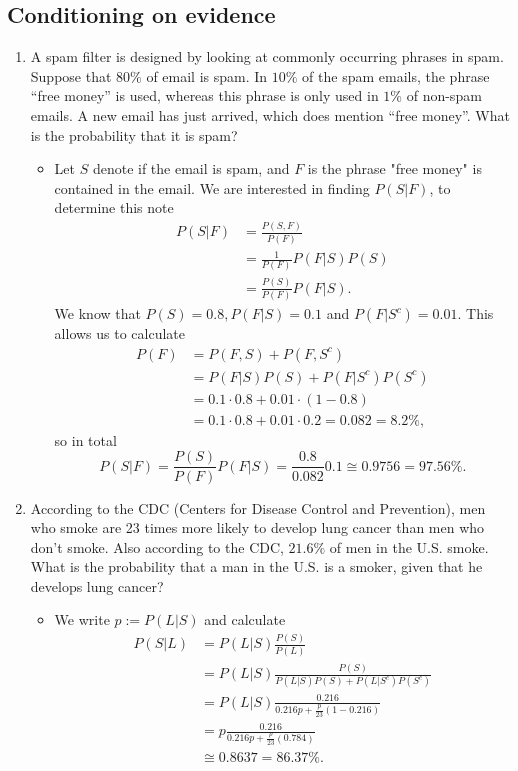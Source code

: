 \documentclass{article}
\begin{document}
\subsection{Conditioning on evidence}
\begin{enumerate}
	\item A spam filter is designed by looking at commonly occurring phrases in spam. Suppose that $80\%$ of email is spam. In $10\%$ of the spam emails, the phrase “free money” is used, whereas this phrase is only used in $1\%$ of non-spam emails. A new email has just arrived, which does mention “free money”. What is the probability that it is spam?
		\begin{itemize}
			\item Let $S$ denote if the email is spam, and $F$ is the phrase "free money" is contained in the email. We are interested in finding $P(S|F)$, to determine this note
			$$
			\begin{aligned}
			P(S|F) &= \frac{P(S, F)}{P(F)} \\
			&= \frac{1}{P(F)} P(F|S)P(S) \\
			&= \frac{P(S)}{P(F)} P(F|S).
			\end{aligned}
			$$
			We know that $P(S) = 0.8, P(F|S) = 0.1$ and $P(F|S^c) = 0.01$. This allows us to calculate
			$$
			\begin{aligned}
			P(F) &= P(F, S) + P(F, S^c) \\
			&= P(F|S)P(S) + P(F|S^c)P(S^c) \\
			&= 0.1 \cdot 0.8 + 0.01 \cdot (1 - 0.8) \\
			&= 0.1 \cdot 0.8 + 0.01 \cdot 0.2 = 0.082 = 8.2\%,
			\end{aligned}
			$$
			so in total
			$$
			P(S|F) = \frac{P(S)}{P(F)} P(F|S) = \frac{0.8}{0.082} 0.1 \cong 0.9756 = 97.56\%.
			$$
		\end{itemize}
	\item According to the CDC (Centers for Disease Control and Prevention), men who smoke are 23 times more likely to develop lung cancer than men who don’t smoke. Also according to the CDC, $21.6\%$ of men in the U.S. smoke. What is the probability that a man in the U.S. is a smoker, given that he develops lung cancer?
		\begin{itemize}
			\item We write $p := P(L|S)$ and calculate
			$$
			\begin{aligned}
			P(S|L) &= P(L|S) \frac{P(S)}{P(L)} \\
			&= P(L|S) \frac{P(S)}{P(L|S)P(S) + P(L|S^c)P(S^c)} \\
			&= P(L|S) \frac{0.216}{0.216p + \frac{p}{23}(1 - 0.216)} \\
			&= p \frac{0.216}{0.216p + \frac{p}{23}(0.784)} \\
			&\cong 0.8637 = 86.37\%.
			\end{aligned}
			$$
		\end{itemize}
\end{enumerate}
\end{document}
